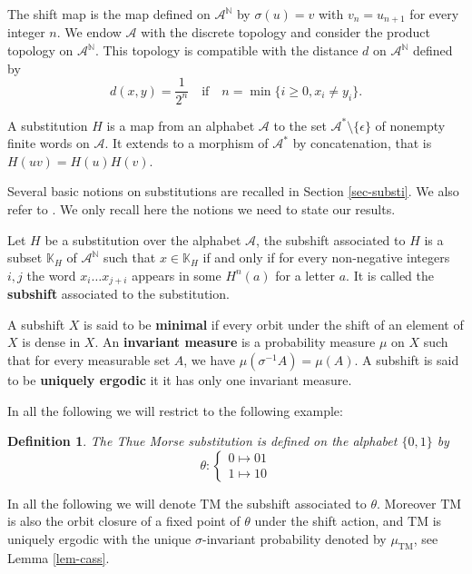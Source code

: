 \documentclass[11 pt]{article}
\newtheorem{definition}[proposition]{Definition}
\def\N{{\mathbb N}}
\def\K{{\mathbb K}}
\def\s{\sigma}
\theoremstyle{definition}
\begin{document}
The shift map is the map defined on $\mathcal{A}^\mathbb{N}$ by $\sigma(u)=v$ with $v_n=u_{n+1}$ for every integer $n$.
We endow $\mathcal A$ with the discrete topology and consider the product topology on $\mathcal A^\N$. This topology is compatible with the distance $d$ on $\mathcal A^{\mathbb N}$ defined by
$$d(x,y)=\frac{1}{2^n}\quad \text{if}\quad n=\min\{i\geq 0,  x_i\neq y_i\}.$$


A substitution $H$ is a map from an alphabet $\mathcal{A}$ to the set $\mathcal{A}^*\setminus\{\epsilon\}$ of nonempty finite words on $\mathcal{A}$. It extends to a morphism of $\mathcal{A}^*$ by concatenation, that is $H(uv)=H(u)H(v)$. 




Several basic notions on substitutions are recalled in Section \ref{sec-substi}. We also refer to  \cite{Pyth.02}. We only recall here the notions we need to state our results. 




\medskip
Let $H$ be a substitution over the alphabet $\mathcal{A}$, the subshift associated to $H$ is a subset $\K_H$ of $\mathcal A^{\mathbb N}$ such that $x\in\K_H$ if  and only if for every non-negative integers $i, j$ the word $x_i\dots x_{j+i}$ appears in some $H^n(a)$ for a letter $a$. It is called the {\bf subshift} associated to the substitution. 

A subshift $X$ is said to be {\bf minimal} if every orbit under the shift of an element of $X$ is dense in $X$. An {\bf invariant measure} is a probability measure $\mu$ on $X$ such that for every measurable set $A$, we have $\mu(\sigma^{-1}A)=\mu(A)$. A subshift is said to be {\bf uniquely ergodic} it it has only one invariant measure.

In all the following we will restrict to the following example:
\begin{definition}
The Thue Morse substitution is defined on the alphabet $\{0,1\}$ by 
$$\theta:\begin{cases}0\mapsto 01\\ 1\mapsto 10\end{cases}$$
\end{definition}

In all the following we will denote $\mathrm{TM}$ the subshift associated to $\theta$. Moreover $\mathrm{TM}$ is also the orbit closure of a fixed point of $\theta$ under the shift action, and $\mathrm{TM}$ is uniquely ergodic with the unique $\s$-invariant probability denoted by $\mu_{\mathrm{TM}}$, see Lemma \ref{lem-cass}. 
\end{document}
